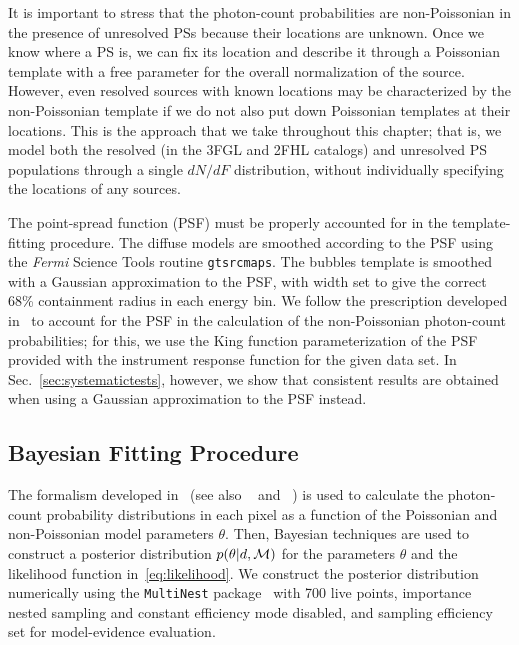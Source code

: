 It is important to stress that the photon-count probabilities are non-Poissonian in the presence of unresolved PSs because their locations are unknown.  Once we know where a PS is, we can fix its location and describe it through a Poissonian template with a free parameter for the overall normalization of the source.  However, even  resolved sources with known locations may be characterized by the non-Poissonian template if we do not also put down Poissonian templates at their locations.  This is the approach that we take throughout this chapter; that is, we model both the resolved (in the 3FGL and 2FHL catalogs) and unresolved PS populations through a single $dN/dF$ distribution, without individually specifying the locations of any sources.    

The point-spread function (PSF) must be properly accounted for in the template-fitting procedure.  The diffuse models are smoothed according to the PSF using the {\it Fermi} Science Tools routine \texttt{gtsrcmaps}.  The bubbles template is smoothed with a Gaussian approximation to the PSF, with width set to give the correct 68\% containment radius in each energy bin.  We follow the prescription developed in~\cite{Malyshev:2011zi} to account for the PSF in the calculation of the non-Poissonian photon-count probabilities; for this, we use the King function parameterization of the PSF provided with the instrument response function for the given data set.  In Sec.~\ref{sec:systematictests}, however, we show that consistent results are obtained when using a Gaussian approximation to the PSF instead.    
 
\subsection{Bayesian Fitting Procedure} 
 
The formalism developed in~\cite{Malyshev:2011zi,Lee:2014mza,Lee:2015fea} (see also ~\cite{Zechlin:2015wdz} and ~\cite{Linden:2016rcf}) is used to calculate the photon-count probability distributions in each pixel as a function of the Poissonian and non-Poissonian model parameters $\theta$.  Then, Bayesian techniques are used to construct a posterior distribution $p(\theta | d, {\cal M})$ for the parameters $\theta$ and the likelihood function in~\eqref{eq:likelihood}.  We construct the posterior distribution numerically using the \texttt{MultiNest} package~\cite{Feroz:2008xx,Buchner:2014nha} with 700 live points, importance nested sampling and constant efficiency mode disabled, and sampling efficiency set for model-evidence evaluation.  
 
